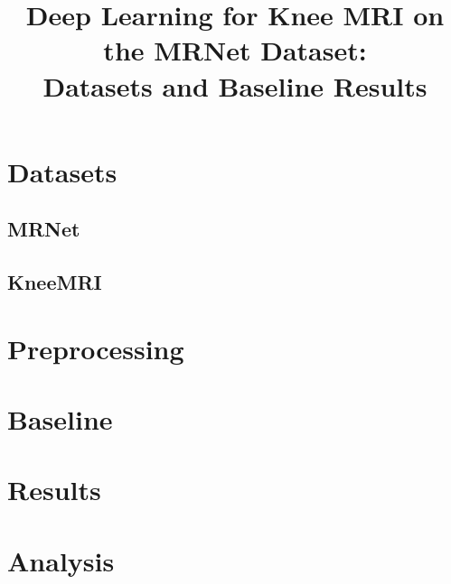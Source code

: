 \documentclass[conference]{IEEEtran}
\begin{document}
\title{Deep Learning for Knee MRI on the MRNet Dataset:\\Datasets and Baseline Results}

\author{
}

\maketitle

\begin{abstract}
\end{abstract}

\section{Datasets}

\subsection{MRNet}

\subsection{KneeMRI}

\section{Preprocessing}

\section{Baseline}

\section{Results}

\section{Analysis}



\end{document}
